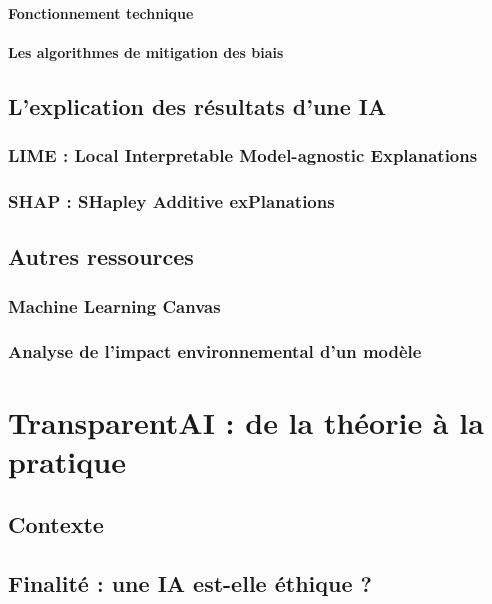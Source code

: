 \documentclass[10pt, french, a4paper]{report}
\begin{document}
\paragraph{Fonctionnement technique}

\paragraph{Les algorithmes de mitigation des biais}

\subsection{L'explication des résultats d'une IA}

\subsubsection{LIME : Local Interpretable Model-agnostic Explanations}

\subsubsection{SHAP : SHapley Additive exPlanations}

\subsection{Autres ressources}

\subsubsection{Machine Learning Canvas}

\subsubsection{Analyse de l'impact environnemental d'un modèle}

\section{TransparentAI : de la théorie à la pratique}

\subsection{Contexte}

\subsection{Finalité : une IA est-elle éthique ?}
\end{document}
